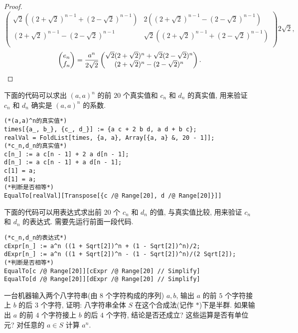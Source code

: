 \documentclass[color=black,device=normal,lang=cn,mode=geye]{elegantnote}
\begin{document}
\begin{proof}
\[{\begin{pmatrix}
        \sqrt{2}((2+\sqrt{2})^{n-1}+(2-\sqrt{2})^{n-1}) & 2((2+\sqrt{2})^{n-1}-(2-\sqrt{2})^{n-1}) \\
        (2+\sqrt{2})^{n-1}-(2-\sqrt{2})^{n-1} & \sqrt{2}((2+\sqrt{2})^{n-1}+(2-\sqrt{2})^{n-1}) \\
    \end{pmatrix}}{2\sqrt{2}},\]
    \[\begin{pmatrix}
        e_n \\ f_n
    \end{pmatrix}=\dfrac{a^n}{2\sqrt{2}}\begin{pmatrix}
        \sqrt{2}(2+\sqrt{2})^n+\sqrt{2}(2-\sqrt{2})^n \\
        (2+\sqrt{2})^n-(2-\sqrt{2})^n
    \end{pmatrix}.\qedhere\]
\end{proof}
\begin{note}
    下面的代码可以求出 $(a,a)^n$ 的前 $20$ 个真实值和 $c_n$ 和 $d_n$ 的真实值, 用来验证 $c_n$ 和 $d_n$ 确实是 $(a,a)^n$ 的系数.
    \begin{verbatim}(*(a,a)^n的真实值*)
times[{a_, b_}, {c_, d_}] := {a c + 2 b d, a d + b c};
realVal = FoldList[times, {a, a}, Array[{a, a} &, 20 - 1]];
(*c_n,d_n的真实值*)
c[n_] := a c[n - 1] + 2 a d[n - 1];
d[n_] := a c[n - 1] + a d[n - 1];
c[1] = a;
d[1] = a;
(*判断是否相等*)
EqualTo[realVal][Transpose[{c /@ Range[20], d /@ Range[20]}]]\end{verbatim}

    下面的代码可以用表达式求出前 $20$ 个 $c_n$ 和 $d_n$ 的值, 与真实值比较, 用来验证 $c_n$ 和 $d_n$ 的表达式. 需要先运行前面一段代码.
    \begin{verbatim}
(*c_n,d_n的表达式*)
cExpr[n_] := a^n ((1 + Sqrt[2])^n + (1 - Sqrt[2])^n)/2;
dExpr[n_] := a^n ((1 + Sqrt[2])^n - (1 - Sqrt[2])^n)/(2 Sqrt[2]);
(*判断是否相等*)
EqualTo[c /@ Range[20]][cExpr /@ Range[20] // Simplify]
EqualTo[d /@ Range[20]][dExpr /@ Range[20] // Simplify]\end{verbatim}
\end{note}
\begin{exercisec}[5.1.3]
    一台机器输入两个八字符串(由 $8$ 个字符构成的序列) $a,b$, 输出 $a$ 的前 $5$ 个字符接上 $b$ 的后 $3$ 个字符, 证明: 八字符串全体 $S$ 在这个合成法(记作 $*$)下是半群. 如果输出 $a$ 的前 $4$ 个字符接上 $b$ 的后 $4$ 个字符, 结论是否还成立? 这些运算是否有单位元? 对任意的 $a\in S$ 计算 $a^n$.
\end{exercisec}
\end{document}
